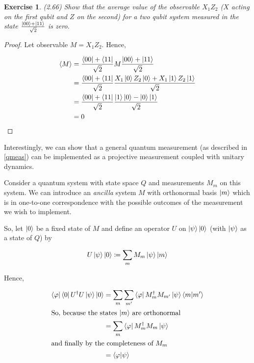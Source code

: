 \documentclass[11pt]{article}
\newcommand\0{\mathbf{0}}
\newcommand\<{\langle}
\renewcommand\>{\rangle}
\renewcommand\phi{\varphi}
\newtheorem{exercise}[theorem]{Exercise}
\begin{document}
\begin{exercise} (2.66)
	Show that the average value of the observable $X_1Z_2$ ($X$ acting on the first qubit and $Z$ on the second) for a two qubit system measured in the state $\frac{\ket{00} + \ket{11}}{\sqrt{2}}$ is zero.
\end{exercise}

\begin{proof}
	Let observable $M = X_1Z_2$. Hence, 
	
	\begin{align*}
	\langle M \rangle &= \frac{\bra{00} + \bra{11}}{\sqrt{2}} M \frac{\ket{00} + \ket{11}}{\sqrt{2}}\\	
	&= \frac{\bra{00} + \bra{11}}{\sqrt{2}}\frac{X_1\ket{0}Z_2\ket{0} + X_1\ket{1}Z_2\ket{1}}{\sqrt{2}} \\
	&= \frac{\bra{00} + \bra{11}}{\sqrt{2}}\frac{\ket{1}\ket{0} - \ket{0}\ket{1}}{\sqrt{2}} \\
	&= 0
	\end{align*}
\end{proof}
 
Interestingly, we can show that a general quantum measurement (as described in \ref{qmeas}) can be implemented as a projective measurement coupled with unitary dynamics.

Consider a quantum system with state space $Q$ and measurements $M_m$ on this system. We can introduce an \textit{ancilla} system $M$ with orthonormal basis $\ket{m}$ which is in one-to-one correspondence with the possible outcomes of the measurement we wish to implement. 

So, let $\ket{0}$ be a fixed state of $M$ and define an operator $U$ on $\ket{\psi}\ket{0}$ (with $\ket{\psi}$ as a state of $Q$) by

\begin{align*}
U\ket{\psi}\ket{0} \coloneqq \sum_m M_m \ket{\psi}\ket{m}
\end{align*}

Hence,

\begin{align*}
\bra{\phi}\bra{0}U^\dag U \ket{\psi}	 \ket{0} &= \sum_m \sum_{m'} \bra{\phi} M_m^\dag M_{m'} \ket{\psi}\bra{m}\ket{m'} \\
\intertext{So, because the states $\ket{m}$ are orthonormal}
&= \sum_m\bra{\phi} M_m^\dag M_{m} \ket{\psi} \\
\intertext{and finally by the completeness of $M_m$}
&= \bra{\phi}\ket{\psi}
\end{align*}
\end{document}
